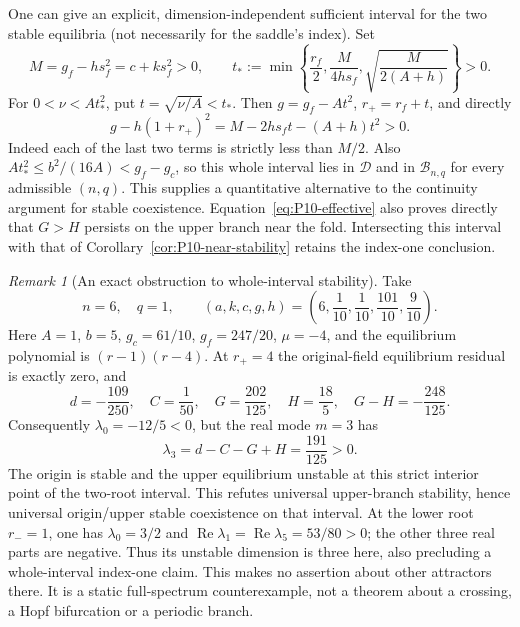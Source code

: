 \documentclass[11pt]{article}
\DeclareMathOperator{\Ree}{Re}
\theoremstyle{definition}
\theoremstyle{remark}
\newtheorem{remark}[theorem]{Remark}
\begin{document}
One can give an explicit, dimension-independent sufficient interval
for the two stable equilibria (not necessarily for the saddle's index).
Set
\begin{equation}
 M=g_f-hs_f^2=c+ks_f^2>0,\qquad
 t_*:=\min\left\{\frac{r_f}{2},\frac{M}{4hs_f},
                         \sqrt{\frac{M}{2(A+h)}}\right\}>0.
 \label{eq:P10-explicit-margin}
\end{equation}
For $0<\nu<A t_*^2$, put $t=\sqrt{\nu/A}<t_*$. Then
$g=g_f-At^2$, $r_+=r_f+t$, and directly
\begin{equation}
 g-h(1+r_+)^2=M-2hs_ft-(A+h)t^2>0.
 \label{eq:P10-explicit-condition}
\end{equation}
Indeed each of the last two terms is strictly less than $M/2$.
Also $At_*^2\le b^2/(16A)<g_f-g_c$, so this whole interval lies
in $\mathcal D$ and in $\mathcal B_{n,q}$ for every admissible
$(n,q)$. This supplies a quantitative alternative to the continuity
argument for stable coexistence. Equation~\eqref{eq:P10-effective}
also proves directly that $G>H$ persists on the upper branch near
the fold. Intersecting this interval with that of
Corollary~\ref{cor:P10-near-stability} retains the index-one conclusion.

\begin{remark}[An exact obstruction to whole-interval stability]
\label{rem:P10-counterexample}
Take
\begin{equation}
 n=6,\quad q=1,\qquad
 (a,k,c,g,h)=\left(6,\frac1{10},\frac1{10},\frac{101}{10},\frac9{10}\right).
 \label{eq:P10-counterexample}
\end{equation}
Here $A=1$, $b=5$, $g_c=61/10$, $g_f=247/20$, $\mu=-4$,
and the equilibrium polynomial is $(r-1)(r-4)$.
At $r_+=4$ the original-field equilibrium residual is exactly zero,
and
\[
 d=-\frac{109}{250},\quad C=\frac1{50},\quad
 G=\frac{202}{125},\quad H=\frac{18}{5},\quad
 G-H=-\frac{248}{125}.
\]
Consequently $\lambda_0=-12/5<0$, but the real mode $m=3$ has
\begin{equation}
 \lambda_3=d-C-G+H=\frac{191}{125}>0.
 \label{eq:P10-counterexample-mode}
\end{equation}
The origin is stable and the upper equilibrium unstable at this
strict interior point of the two-root interval. This refutes universal
upper-branch stability, hence universal origin/upper stable coexistence
on that interval. At the lower root $r_-=1$, one has
$\lambda_0=3/2$ and $\Ree\lambda_1=\Ree\lambda_5=53/80>0$;
the other three real parts are negative. Thus its unstable dimension
is three here, also precluding a whole-interval index-one claim.
This makes no assertion about other attractors there.
It is a static full-spectrum counterexample, not a theorem about a
crossing, a Hopf bifurcation or a periodic branch.
\end{remark}
\end{document}
